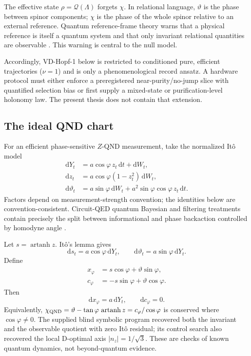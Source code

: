 \documentclass[10pt]{article}
\theoremstyle{definition}
\theoremstyle{remark}
\newcommand{\artanh}{\operatorname{artanh}}
\newcommand{\dd}{\mathrm d}
\newcommand{\cQ}{\mathcal Q}
\begin{document}
The effective state \(\rho=\cQ(\Lambda)\) forgets \(\chi\). In relational language, \(\vartheta\) is the phase between spinor components; \(\chi\) is the phase of the whole spinor relative to an external reference. Quantum reference-frame theory warns that a physical reference is itself a quantum system and that only invariant relational quantities are observable \citep{Bartlett2007,Loveridge2018}. This warning is central to the null model.

Accordingly, VD-Hopf-1 below is restricted to conditioned pure, efficient trajectories (\(\nu=1\)) and is only a phenomenological record ansatz. A hardware protocol must either enforce a preregistered near-purity/no-jump slice with quantified selection bias or first supply a mixed-state or purification-level holonomy law. The present thesis does not contain that extension.

\subsection{The ideal QND chart}

For an efficient phase-sensitive \(Z\)-QND measurement, take the normalized It\^o model
\begin{align}
  \dd Y_t&=a\cos\varphi\,z_t\,\dd t+\dd W_t,
  \label{eq:qnd-record}\\
  \dd z_t&=a\cos\varphi(1-z_t^2)\,\dd W_t,
  \label{eq:qnd-z}\\
  \dd\vartheta_t
  &=a\sin\varphi\,\dd W_t
  +a^2\sin\varphi\cos\varphi\,z_t\,\dd t .
  \label{eq:qnd-theta}
\end{align}
Factors depend on measurement-strength convention; the identities below are convention-consistent. Circuit-QED quantum Bayesian and filtering treatments contain precisely the split between informational and phase backaction controlled by homodyne angle \citep{Korotkov2011,Gambetta2008,Hatridge2013}.

Let \(s=\artanh z\). It\^o's lemma gives
\begin{equation}
  \dd s_t=a\cos\varphi\,\dd Y_t,
  \qquad
  \dd\vartheta_t=a\sin\varphi\,\dd Y_t.
  \label{eq:qnd-linear}
\end{equation}
Define
\begin{align}
  x_\varphi&=s\cos\varphi+\vartheta\sin\varphi,\\
  c_\varphi&=-s\sin\varphi+\vartheta\cos\varphi.
\end{align}
Then
\begin{equation}
  \boxed{\quad
  \dd x_\varphi=a\,\dd Y_t,\qquad
  \dd c_\varphi=0.
  \quad}
  \label{eq:qnd-translation}
\end{equation}
Equivalently,
\(\chi_{\rm QND}=\vartheta-\tan\varphi\,\artanh z
=c_\varphi/\cos\varphi\)
is conserved where \(\cos\varphi\neq0\). The supplied blind symbolic program recovered both the invariant and the observable quotient with zero It\^o residual; its control search also recovered the local D-optimal axis \(|n_z|=1/\sqrt3\). These are checks of known quantum dynamics, not beyond-quantum evidence.
\end{document}
